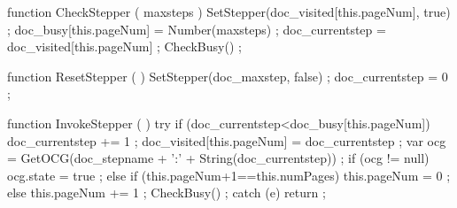     function CheckStepper ( maxsteps ) {
        SetStepper(doc_visited[this.pageNum], true) ;
        doc_busy[this.pageNum] = Number(maxsteps) ;
        doc_currentstep = doc_visited[this.pageNum] ;
        CheckBusy() ;
    }

    function ResetStepper ( ) {
        SetStepper(doc_maxstep, false) ;
        doc_currentstep = 0 ;
    }

    function InvokeStepper ( ) {
        try {
            if (doc_currentstep<doc_busy[this.pageNum]) {
                doc_currentstep += 1 ;
                doc_visited[this.pageNum] = doc_currentstep ;
                var ocg = GetOCG(doc_stepname + ':' + String(doc_currentstep)) ;
                if (ocg != null) {
                    ocg.state = true ;
                }
            } else {
                if (this.pageNum+1==this.numPages) {
                    this.pageNum  = 0 ;
                } else {
                    this.pageNum += 1 ;
                }
            }
            CheckBusy() ;
        } catch (e) {
            return ;
        }
    }

\stopJSpreamble


\endinput